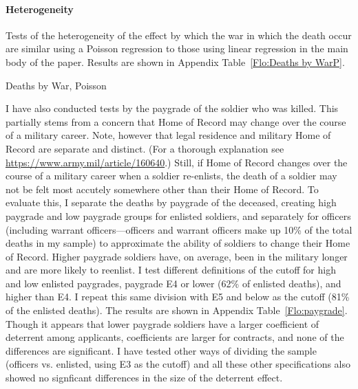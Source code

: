 \documentclass[12pt] {article}
\begin{document}
\begin{table}
\caption{}
\label{Flo:allrecruits}
\scalebox{0.8}{
}
\end{table}

\paragraph {Heterogeneity}
Tests of the heterogeneity of the effect by which the war in which the death occur are similar using a Poisson regression to those using linear regression in the main body of the paper. Results are shown in Appendix Table~\ref{Flo:Deaths by WarP}.

\begin{table}
\caption{Deaths by War, Poisson}
\label{Flo:Deaths by WarP}

\end{table}

I have also conducted tests by the paygrade of the soldier who was killed. This partially stems from a concern that Home of Record may change over the course of a military career. Note, however that legal residence and military Home of Record are separate and distinct. (For a thorough explanation see \url{https://www.army.mil/article/160640}.) Still, if Home of Record changes over the course of a military career when a soldier re-enlists, the death of a soldier may not be felt most accutely somewhere other than their Home of Record. To evaluate this, I separate the deaths by paygrade of the deceased, creating high paygrade and low paygrade groups for enlisted soldiers, and separately for officers (including warrant officers---officers and warrant officers make up 10\% of the total deaths in my sample) to approximate the ability of soldiers to change their Home of Record. Higher paygrade soldiers have, on average, been in the military longer and are more likely to reenlist. I test different definitions of the cutoff for high and low enlisted paygrades, paygrade E4 or lower (62\% of enlisted deaths), and higher than E4. I repeat this same division with E5 and below as the cutoff (81\% of the enlisted deaths). The results are shown in Appendix Table~\ref{Flo:paygrade}. Though it appears that lower paygrade soldiers have a larger coefficient of deterrent among applicants, coefficients are larger for contracts, and none of the differences are significant. I have tested other ways of dividing the sample (officers vs. enlisted, using E3 as the cutoff) and all these other specifications also showed no signficant differences in the size of the deterrent effect.
\end{document}
